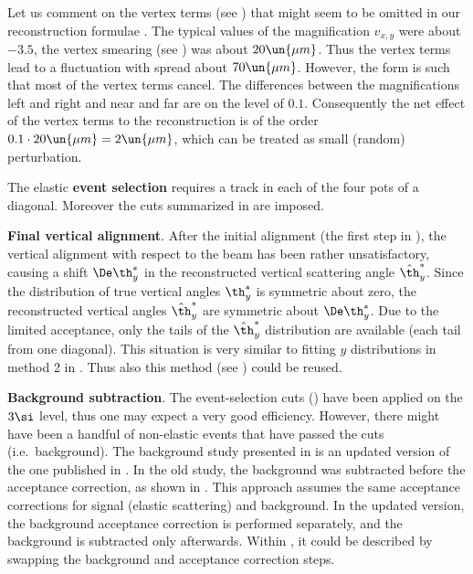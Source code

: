 \par\parindent\itindent\indent\hang
Let us comment on the vertex terms (see ) that might seem to be omitted in our reconstruction formulae . The typical values of the magnification $v_{x, y}$ were about $-3.5$, the vertex smearing (see ) was about $20\un{\mu m}$. Thus the vertex terms lead to a fluctuation with spread about $70\un{\mu m}$. However, the form  is such that most of the vertex terms cancel. The differences between the magnifications left and right and near and far are on the level of $0.1$. Consequently the net effect of the vertex terms to the reconstruction is of the order $0.1 \cdot 20\un{\mu m} = 2\un{\mu m}$, which can be treated as small (random) perturbation.

\> The elastic {\bf event selection} requires a track in each of the four pots of a diagonal. Moreover the cuts summarized in  are imposed.

\> {\bf Final vertical alignment}. After the initial alignment (the first step in ), the vertical alignment with respect to the beam has been rather unsatisfactory, causing a shift $\De\th_y^*$ in the reconstructed vertical scattering angle $\hat \th_y^*$. Since the distribution of true vertical angles $\th_y^*$ is symmetric about zero, the reconstructed vertical angles $\hat\th_y^*$ are symmetric about $\De\th_y^*$. Due to the limited acceptance, only the tails of the $\hat\th_y^*$ distribution are available (each tail from one diagonal). This situation is very similar to fitting $y$ distributions in method 2 in . Thus also this method (see ) could be reused.

\> {\bf Background subtraction}. The event-selection cuts () have been applied on the $3\si$ level, thus one may expect a very good efficiency. However, there might have been a handful of non-elastic events that have passed the cuts (i.e.~background). The background study presented in  is an updated version of the one published in . In the old study, the background was subtracted before the acceptance correction, as shown in . This approach assumes the same acceptance corrections for signal (elastic scattering) and background. In the updated version, the background acceptance correction is performed separately, and the background is subtracted only afterwards. Within , it could be described by swapping the background and acceptance correction steps.

